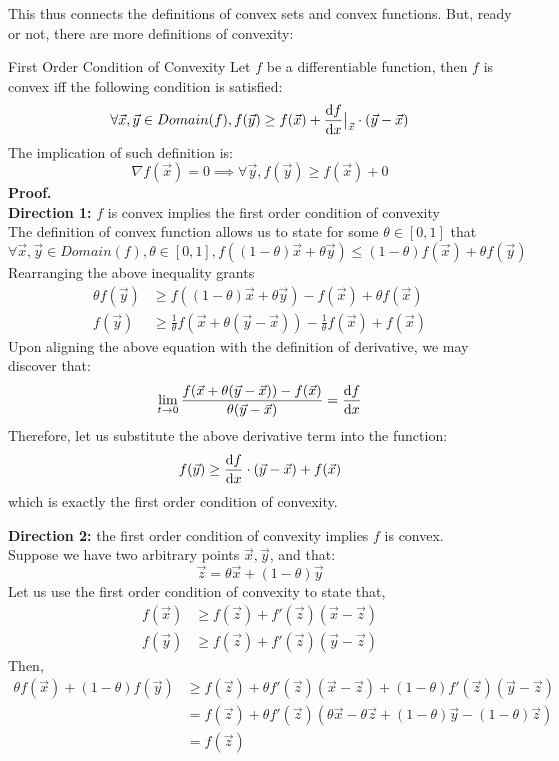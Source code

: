 This thus connects the definitions of convex sets and convex functions.
But, ready or not, there are more definitions of convexity:
\begin{ln-define}{First Order Condition of Convexity}{}
    Let $f$ be a differentiable function, then $f$ is convex iff the following condition is satisfied:
    \[
        \forall \vec{x}, \vec{y} \in Domain(f), f(\vec{y}) \geq f(\vec{x}) + \dv{f}{x} \big|_{\vec{x}} \cdot (\vec{y} - \vec{x})
    \]
    The implication of such definition is:
    \[
        \nabla f(\vec{x}) = 0 \implies \forall \vec{y}, f(\vec{y}) \geq f(\vec{x}) + 0
    \]
    \tcblower
    \textbf{Proof.} \\
    \textbf{Direction 1:} $f$ is convex implies the first order condition of convexity \\
    The definition of convex function allows us to state for some $\theta \in [0, 1]$ that
    \[
        \forall \vec{x}, \vec{y} \in Domain(f), \theta \in [0, 1], f((1 - \theta) \vec{x} + \theta \vec{y}) \leq (1 - \theta) f(\vec{x}) + \theta f(\vec{y})
    \]
    Rearranging the above inequality grants
    \begin{align*}
        \theta f(\vec{y}) &\geq f((1 - \theta) \vec{x} + \theta \vec{y}) - f(\vec{x}) + \theta f(\vec{x}) \\
        f(\vec{y}) &\geq \frac{1}{\theta} f(\vec{x} + \theta (\vec{y} - \vec{x})) - \frac{1}{\theta} f(\vec{x}) + f(\vec{x})
    \end{align*}
    Upon aligning the above equation with the definition of derivative, we may discover that:
    \[
        \lim_{t \rightarrow 0} \frac{f(\vec{x} + \theta (\vec{y} - \vec{x})) - f(\vec{x})}{\theta (\vec{y} - \vec{x})} = \dv{f}{x}
    \]
    Therefore, let us substitute the above derivative term into the function:
    \[
        f(\vec{y}) \geq \dv{f}{x} \cdot (\vec{y} - \vec{x}) + f(\vec{x})
    \]
    which is exactly the first order condition of convexity.
    \par
    \textbf{Direction 2:} the first order condition of convexity implies $f$ is convex. \\
    Suppose we have two arbitrary points $\vec{x}, \vec{y}$, and that:
    \[
        \vec{z} = \theta \vec{x} + (1 - \theta) \vec{y}
    \]
    Let us use the first order condition of convexity to state that,
    \begin{align*}
        f(\vec{x}) &\geq f(\vec{z}) + f'(\vec{z}) (\vec{x} - \vec{z}) \\
        f(\vec{y}) &\geq f(\vec{z}) + f'(\vec{z}) (\vec{y} - \vec{z})
    \end{align*}
    Then,
    \begin{align*}
        \theta f(\vec{x}) + (1 - \theta) f(\vec{y})
        &\geq f(\vec{z}) + \theta f'(\vec{z}) (\vec{x} - \vec{z}) + (1 - \theta) f'(\vec{z}) (\vec{y} - \vec{z}) \\
        &= f(\vec{z}) + \theta f'(\vec{z}) (\theta \vec{x} - \theta \vec{z} + (1 - \theta) \vec{y} - (1 - \theta) \vec{z}) \\
        &= f(\vec{z})
    \end{align*}
\end{ln-define}

